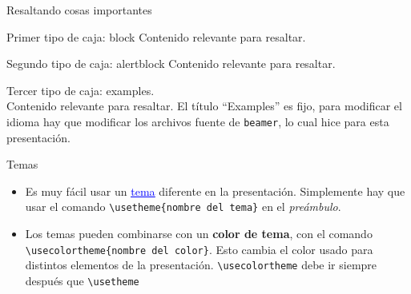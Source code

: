 \documentclass{beamer}
\begin{document}
    \begin{frame}[fragile]{Resaltando cosas importantes}
        \begin{minipage}{0.5\textwidth}
            \begin{block}{Primer tipo de caja: block}
                Contenido relevante para resaltar.
            \end{block}
        \end{minipage}
        \begin{alertblock}{Segundo tipo de caja: alertblock}
            Contenido relevante para resaltar.
        \end{alertblock}
        \begin{examples}
            Tercer tipo de caja: examples. \\ 
            Contenido relevante para resaltar. El título ``Examples''
            es fijo, para modificar el idioma hay que modificar los archivos
            fuente de \texttt{beamer}, lo cual hice para esta presentación.
        \end{examples}
    \end{frame}
    \begin{frame}[fragile]{Temas}
        \begin{itemize}
            \justifying
            \item Es muy fácil usar un \href{https://hartwork.org/beamer-theme-matrix/}{\textcolor{blue}{\underline{tema}}} diferente en la presentación. Simplemente hay que usar el comando
            {\color{mygreen}\verb|\usetheme{|}\verb|nombre del tema|{\color{mygreen}\verb|}|} en el
            \textsl{preámbulo}.
            \item Los temas pueden combinarse con un \textbf{color de tema}, con el comando {\color{mygreen}\verb|\usecolortheme{|}\verb|nombre del color|{\color{mygreen}\verb|}|}.
            Esto cambia el color usado para distintos elementos de la presentación. {\color{mygreen}\verb|\usecolortheme|} debe ir
            siempre después que  {\color{mygreen}\verb|\usetheme|}
        \end{itemize}
    \end{frame}    
\end{document}
